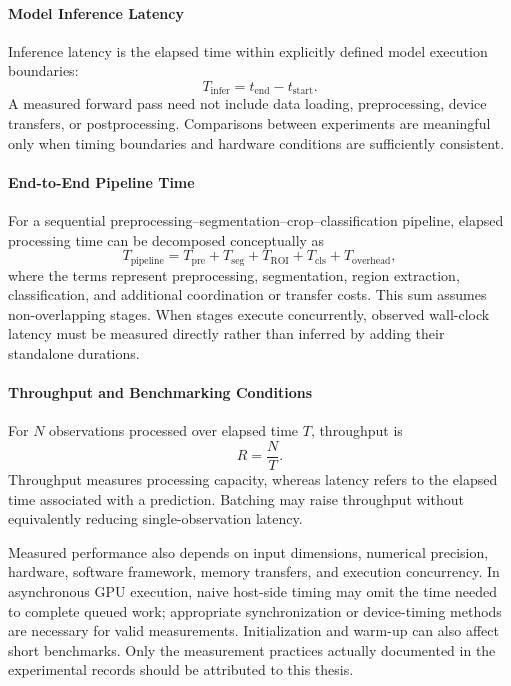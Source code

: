 \paragraph{Model Inference Latency}
Inference latency is the elapsed time within explicitly defined model execution boundaries:
\begin{equation}
T_{\mathrm{infer}}=t_{\mathrm{end}}-t_{\mathrm{start}}.
\end{equation}
A measured forward pass need not include data loading, preprocessing, device transfers, or postprocessing. Comparisons between experiments are meaningful only when timing boundaries and hardware conditions are sufficiently consistent.

\paragraph{End-to-End Pipeline Time}
For a sequential preprocessing--segmentation--crop--classification pipeline, elapsed processing time can be decomposed conceptually as
\begin{equation}
T_{\mathrm{pipeline}}=
T_{\mathrm{pre}}+T_{\mathrm{seg}}+T_{\mathrm{ROI}}+
T_{\mathrm{cls}}+T_{\mathrm{overhead}},
\end{equation}
where the terms represent preprocessing, segmentation, region extraction, classification, and additional coordination or transfer costs. This sum assumes non-overlapping stages. When stages execute concurrently, observed wall-clock latency must be measured directly rather than inferred by adding their standalone durations.

\paragraph{Throughput and Benchmarking Conditions}
For $N$ observations processed over elapsed time $T$, throughput is
\begin{equation}
R=\frac{N}{T}.
\end{equation}
Throughput measures processing capacity, whereas latency refers to the elapsed time associated with a prediction. Batching may raise throughput without equivalently reducing single-observation latency.

Measured performance also depends on input dimensions, numerical precision, hardware, software framework, memory transfers, and execution concurrency. In asynchronous GPU execution, naive host-side timing may omit the time needed to complete queued work; appropriate synchronization or device-timing methods are necessary for valid measurements. Initialization and warm-up can also affect short benchmarks. Only the measurement practices actually documented in the experimental records should be attributed to this thesis.

